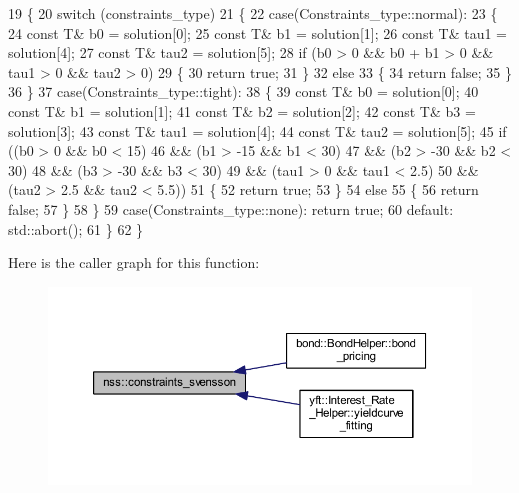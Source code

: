 \begin{DoxyCode}
19     \{
20         \textcolor{keywordflow}{switch} (constraints\_type)
21         \{
22         \textcolor{keywordflow}{case}(Constraints\_type::normal):
23         \{
24             \textcolor{keyword}{const} T& b0 = solution[0];
25             \textcolor{keyword}{const} T& b1 = solution[1];
26             \textcolor{keyword}{const} T& tau1 = solution[4];
27             \textcolor{keyword}{const} T& tau2 = solution[5];
28             \textcolor{keywordflow}{if} (b0 > 0 && b0 + b1 > 0 && tau1 > 0 && tau2 > 0)
29             \{
30                 \textcolor{keywordflow}{return} \textcolor{keyword}{true};
31             \}
32             \textcolor{keywordflow}{else}
33             \{
34                 \textcolor{keywordflow}{return} \textcolor{keyword}{false};
35             \}
36         \}
37         \textcolor{keywordflow}{case}(Constraints\_type::tight):
38         \{
39             \textcolor{keyword}{const} T& b0 = solution[0];
40             \textcolor{keyword}{const} T& b1 = solution[1];
41             \textcolor{keyword}{const} T& b2 = solution[2];
42             \textcolor{keyword}{const} T& b3 = solution[3];
43             \textcolor{keyword}{const} T& tau1 = solution[4];
44             \textcolor{keyword}{const} T& tau2 = solution[5];
45             \textcolor{keywordflow}{if} ((b0 > 0 && b0 < 15)
46                 && (b1 > -15 && b1 < 30)
47                 && (b2 > -30 && b2 < 30)
48                 && (b3 > -30 && b3 < 30)
49                 && (tau1 > 0 && tau1 < 2.5)
50                 && (tau2 > 2.5 && tau2 < 5.5))
51             \{
52                 \textcolor{keywordflow}{return} \textcolor{keyword}{true};
53             \}
54             \textcolor{keywordflow}{else}
55             \{
56                 \textcolor{keywordflow}{return} \textcolor{keyword}{false};
57             \}
58         \}
59         \textcolor{keywordflow}{case}(Constraints\_type::none): \textcolor{keywordflow}{return} \textcolor{keyword}{true};
60         \textcolor{keywordflow}{default}: std::abort();
61         \}
62     \}
\end{DoxyCode}
Here is the caller graph for this function\+:
\nopagebreak
\begin{figure}[H]
\begin{center}
\leavevmode
\includegraphics[width=350pt]{namespacenss_a39de3569a71e773f9da82c713eb7e6eb_icgraph}
\end{center}
\end{figure}
\mbox{\label{namespacenss_a009a0ebbca20f7969d0c2ed5a241aa82}} 
